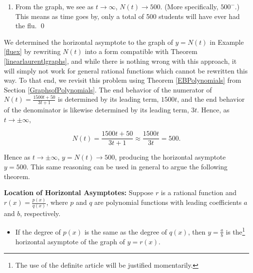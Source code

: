 \begin{ex}
\begin{ex}
\begin{enumerate}
\begin{figure}
\begin{center}
\caption{}
\label{fig:yeqnt}
\end{center}
\end{figure}
  
\item  From the graph, we see as $t \rightarrow \infty$, $N(t) \rightarrow 500$. (More specifically, $500^{-}$.)  This means as time goes by, only a total of 500 students will have ever had the flu. \qed

\end{enumerate}

\end{ex}
 
 We determined the horizontal asymptote to the graph of $y = N(t)$ in Example \ref{fluex} by rewriting $N(t)$ into a form compatible with Theorem  \ref{linearlaurentlgraphs}, and while there is nothing wrong with this approach, it will simply not work for general rational functions which cannot be rewritten this way.  To that end, we revisit this problem using Theorem \ref{EBPolynomials} from Section \ref{GraphsofPolynomials}.  The end behavior of the numerator of $N(t) = \frac{1500t + 50}{3t+1}$ is determined by its leading term,  $1500t$,  and the end behavior of the denominator is likewise determined  by its leading term, $3t$.  Hence, as $t \rightarrow \pm \infty$, 
 
 \[ N(t) = \dfrac{1500t + 50}{3t+1} \approx \dfrac{1500t}{3t} = 500.\]
 
Hence as $t \rightarrow \pm \infty$, $y = N(t) \rightarrow 500$, producing the horizontal asymptote $y = 500$.  This same reasoning can be used in general to argue the following theorem.

\smallskip
\begin{tcolorbox}

\begin{thm} \textbf{Location of Horizontal Asymptotes:}\label{hathm} Suppose $r$ is a rational function and $r(x) = \frac{p(x)}{q(x)}$, where $p$ and $q$ are polynomial functions with leading coefficients $a$ and $b$, respectively. 

\begin{itemize}

\item  If the degree of $p(x)$ is the same as the degree of $q(x)$, then $y=\frac{a}{b}$ is the\footnote{The use of the definite article will be justified momentarily.} horizontal asymptote of the graph of $y=r(x)$.


\end{itemize}
\end{thm}
\end{tcolorbox}
\end{ex}
